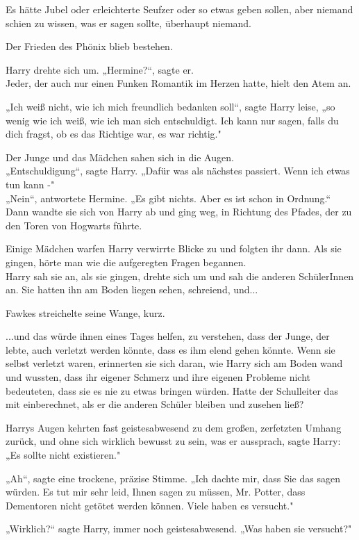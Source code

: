 {Es hätte Jubel oder erleichterte Seufzer oder so etwas geben sollen, aber niemand schien zu wissen, was er sagen sollte, überhaupt niemand.

Der Frieden des Phönix blieb bestehen.

Harry drehte sich um. „Hermine?“, sagte er.\\ Jeder, der auch nur einen Funken Romantik im Herzen hatte, hielt den Atem an.

„Ich weiß nicht, wie ich mich freundlich bedanken soll“, sagte Harry leise, „so wenig wie ich weiß, wie ich man sich entschuldigt. Ich kann nur sagen, falls du dich fragst, ob es das Richtige war, es war richtig."

Der Junge und das Mädchen sahen sich in die Augen.\\ „Entschuldigung“, sagte Harry. „Dafür was als nächstes passiert. Wenn ich etwas tun kann -"\\ „Nein“, antwortete Hermine. „Es gibt nichts. Aber es ist schon in Ordnung.“ Dann wandte sie sich von Harry ab und ging weg, in Richtung des Pfades, der zu den Toren von Hogwarts führte.

Einige Mädchen warfen Harry verwirrte Blicke zu und folgten ihr dann. Als sie gingen, hörte man wie die aufgeregten Fragen begannen.\\ Harry sah sie an, als sie gingen, drehte sich um und sah die anderen SchülerInnen an. Sie hatten ihn am Boden liegen sehen, schreiend, und...

Fawkes streichelte seine Wange, kurz.

...und das würde ihnen eines Tages helfen, zu verstehen, dass der Junge, der lebte, auch verletzt werden könnte, dass es ihm elend gehen könnte. Wenn sie selbst verletzt waren, erinnerten sie sich daran, wie Harry sich am Boden wand und wussten, dass ihr eigener Schmerz und ihre eigenen Probleme nicht bedeuteten, dass sie es nie zu etwas bringen würden. Hatte der Schulleiter das mit einberechnet, als er die anderen Schüler bleiben und zusehen ließ?

Harrys Augen kehrten fast geistesabwesend zu dem großen, zerfetzten Umhang zurück, und ohne sich wirklich bewusst zu sein, was er aussprach, sagte Harry: „Es sollte nicht existieren."

„Ah“, sagte eine trockene, präzise Stimme. „Ich dachte mir, dass Sie das sagen würden. Es tut mir sehr leid, Ihnen sagen zu müssen, Mr. Potter, dass Dementoren nicht getötet werden können. Viele haben es versucht."

„Wirklich?“ sagte Harry, immer noch geistesabwesend. „Was haben sie versucht?"

}
